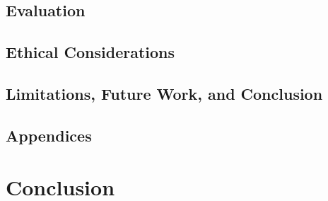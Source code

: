 \documentclass[10pt,twocolumn]{article}
\begin{document}
\subsection{Evaluation}

\subsection{Ethical Considerations}

\subsection{Limitations, Future Work, and Conclusion}

\subsection{Appendices}

\section{Conclusion}

\printbibliography 
\end{document}
